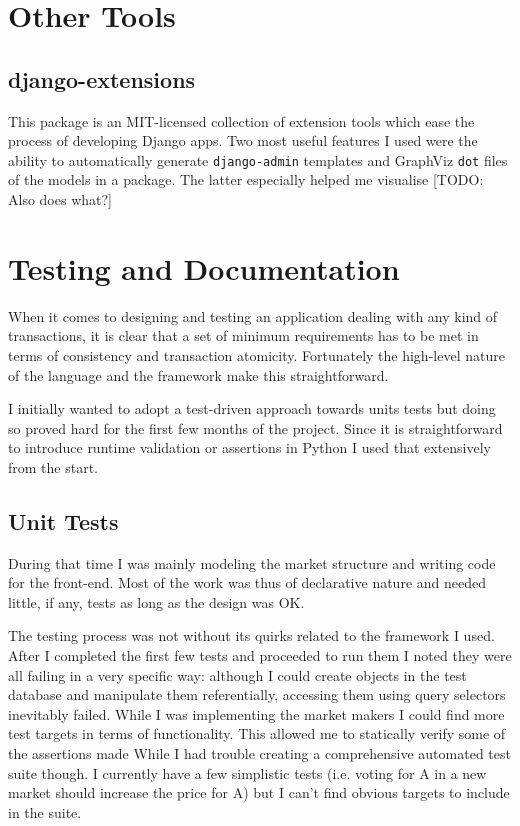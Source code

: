 \documentclass[bsc,frontabs,twoside,singlespacing,parskip,deptreport]{infthesis}     %
\begin{document}
\section{Other Tools}

\subsection{django-extensions}
    This package is an MIT-licensed collection of extension tools which ease the process of developing Django apps. Two most useful features I used were the ability to automatically generate {\tt django-admin} templates and GraphViz {\tt dot} files of the models in a package. The latter especially helped me visualise [TODO: Also does what?]


\section{Testing and Documentation}
	When it comes to designing and testing an application dealing with any kind of transactions, it is clear that a set of minimum requirements has to be met in terms of consistency and transaction atomicity. Fortunately the high-level nature of the language and the framework make this straightforward. 

	I initially wanted to adopt a test-driven approach towards units tests but doing so proved hard for the first few months of the project. Since it is straightforward to introduce runtime validation or assertions in Python I used that extensively from the start. 
\subsection{Unit Tests}
	During that time I was mainly modeling the market structure and writing code for the front-end. Most of the work was thus of declarative nature and needed little, if any, tests as long as the design was OK. 

	The testing process was not without its quirks related to the framework I used. After I completed the first few tests and proceeded to run them I noted they were all failing in a very specific way: although I could create objects in the test database and manipulate them referentially, accessing them using query selectors inevitably failed. 
	While I was implementing the market makers I could find more test targets in terms of functionality. This allowed me to statically verify some of the assertions made 
While I had trouble creating a comprehensive automated test suite though. I currently have a few simplistic tests (i.e. voting for A in a new market should increase the price for A) but I can’t find obvious targets to include in the suite.
\end{document}
